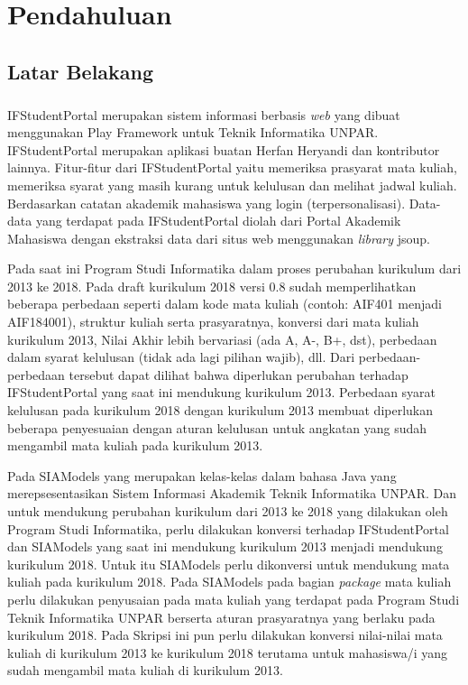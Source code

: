 \chapter{Pendahuluan}
\label{chap:intro}
   
\section{Latar Belakang}
\label{sec:label}

\paragraph{} IFStudentPortal\cite{ifstudentportal} merupakan sistem informasi berbasis  \textit{web} yang dibuat menggunakan Play Framework \cite{Leroux:2014} untuk Teknik Informatika UNPAR. IFStudentPortal merupakan aplikasi buatan Herfan Heryandi dan kontributor lainnya. Fitur-fitur dari IFStudentPortal yaitu memeriksa prasyarat mata kuliah, memeriksa syarat yang masih kurang untuk kelulusan dan melihat jadwal kuliah. Berdasarkan catatan akademik mahasiswa yang login (terpersonalisasi). Data-data yang terdapat pada IFStudentPortal diolah dari Portal Akademik Mahasiswa dengan ekstraksi data dari situs web menggunakan \textit{library} jsoup.

Pada saat ini Program Studi Informatika dalam proses perubahan kurikulum dari 2013 ke 2018. Pada draft kurikulum 2018 versi 0.8 \cite{draftkurikulum2018} sudah memperlihatkan beberapa perbedaan seperti dalam kode mata kuliah (contoh: AIF401 menjadi AIF184001), struktur kuliah serta prasyaratnya, konversi dari mata kuliah kurikulum 2013, Nilai Akhir lebih bervariasi (ada A, A-, B+, dst), perbedaan dalam syarat kelulusan (tidak ada lagi pilihan wajib), dll. Dari perbedaan-perbedaan tersebut dapat dilihat bahwa diperlukan perubahan terhadap IFStudentPortal yang saat ini mendukung kurikulum 2013. Perbedaan syarat kelulusan pada kurikulum 2018 dengan kurikulum 2013 membuat diperlukan beberapa penyesuaian dengan aturan kelulusan untuk angkatan yang sudah mengambil mata kuliah pada kurikulum 2013.

Pada SIAModels\cite{siamodels} yang merupakan kelas-kelas dalam bahasa Java yang merepsesentasikan Sistem Informasi Akademik Teknik Informatika UNPAR. Dan untuk mendukung perubahan kurikulum dari 2013 ke 2018 yang dilakukan oleh Program Studi Informatika, perlu dilakukan konversi terhadap IFStudentPortal dan SIAModels yang saat ini mendukung kurikulum 2013 menjadi mendukung kurikulum 2018.  Untuk itu SIAModels perlu dikonversi untuk mendukung mata kuliah pada kurikulum 2018. Pada SIAModels pada bagian \textit{package} mata kuliah perlu dilakukan penyusaian pada mata kuliah yang terdapat pada Program Studi Teknik Informatika UNPAR berserta aturan prasyaratnya yang berlaku pada kurikulum 2018. Pada Skripsi ini pun perlu dilakukan konversi nilai-nilai mata kuliah di kurikulum 2013 ke kurikulum 2018 terutama untuk mahasiswa/i yang sudah mengambil mata kuliah di kurikulum 2013.

